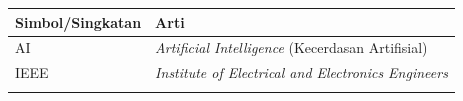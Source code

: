 \clearpage
{}


\begin{longtable}{@{}p{2.8cm}p{7.5cm}@{}}
\textbf{Simbol/Singkatan} & \textbf{Arti} \\ \hline
\endhead
AI   & \textit{Artificial Intelligence} (Kecerdasan Artifisial) \\
IEEE & \textit{Institute of Electrical and Electronics Engineers} \\
\isian{\dots} & \isian{\dots} \\
\end{longtable}

